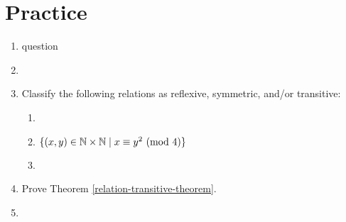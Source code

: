 \documentclass[main.tex]{subfiles}
\begin{document}
\section{Practice}

\begin{enumerate}
	\item question
	\item 
	\item Classify the following relations as reflexive, symmetric, and/or transitive:
	\begin{enumerate}
		\item 
		\item \(\{(x,y) \in \mathbb{N} \times \mathbb{N} \mid x \equiv y^2 \ (\mathrm{mod}\ 4)\}\)
		\item 
	\end{enumerate}
	\item Prove Theorem \ref{relation-transitive-theorem}.
	\item 
\end{enumerate}
\end{document}
